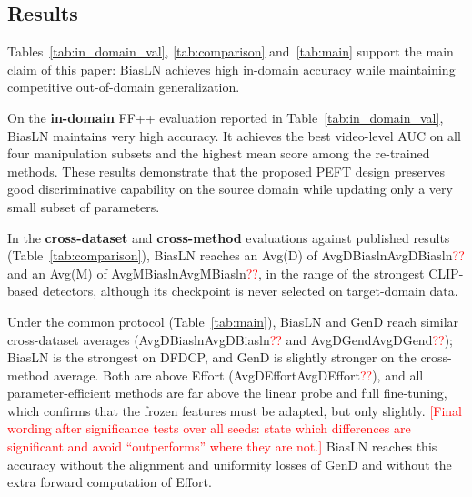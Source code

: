 \documentclass[fonts]{icst}
\newif\ifrevmark\revmarkfalse
\newcommand{\rev}[1]{\ifrevmark{\color{revblue}#1}\else#1\fi}
\newenvironment{revblock}{\ifrevmark\color{revblue}\fi}{}
\newif\ifpending\pendingtrue
\newcommand{\pending}[1]{\ifpending\textcolor{red}{[#1]}\else\errmessage{pending text left: #1}\fi}
\newcommand{\num}[1]{\ifcsname #1\endcsname\csname #1\endcsname\else\textcolor{red}{??}\fi}
\begin{document}
\subsection{Results}
\label{sec:main}

Tables~\ref{tab:in_domain_val}, \ref{tab:comparison} \rev{and~\ref{tab:main}} support the main claim of this paper: BiasLN achieves high in-domain accuracy while maintaining competitive out-of-domain generalization.

On the \textbf{in-domain} FF++ evaluation reported in Table~\ref{tab:in_domain_val}, BiasLN maintains very high accuracy. It achieves the best video-level AUC on all four manipulation subsets and the highest mean score \rev{among the re-trained methods}. These results \rev{demonstrate} that the proposed PEFT design preserves good discriminative capability on the source domain while updating only a very small subset of parameters.

\begin{revblock}
In the \textbf{cross-dataset} and \textbf{cross-method} evaluations against published results (Table~\ref{tab:comparison}), BiasLN reaches an Avg(D) of \num{AvgDBiasln} and an Avg(M) of \num{AvgMBiasln}, in the range of the strongest CLIP-based detectors, although its checkpoint is never selected on target-domain data.

Under the common protocol (Table~\ref{tab:main}), BiasLN and GenD reach similar cross-dataset averages (\num{AvgDBiasln} and \num{AvgDGend}); BiasLN is the strongest on DFDCP, and GenD is slightly stronger on the cross-method average. Both are above Effort (\num{AvgDEffort}), and all parameter-efficient methods are far above the linear probe and full fine-tuning, which confirms that the frozen features must be adapted, but only slightly. \pending{Final wording after significance tests over all seeds: state which differences are significant and avoid ``outperforms'' where they are not.} BiasLN reaches this accuracy without the alignment and uniformity losses of GenD and without the extra forward computation of Effort.
\end{revblock}

\begin{table}[!t]
  \centering
  \captionsetup{labelsep=period, labelfont=bf, hypcap=false}
  \caption{Ablation study of PEFT variants and the effect of $L_2$ normalization before the linear classifier.
\rev{Video AUC; Avg(D) and Avg(M) are mean $\pm$ standard deviation over $n$ seeds, per-dataset values are seed means. Bold: best; shaded: second best.}}
  \label{tab:ablation}
  \small
  \resizebox{0.85\textwidth}{!}{}
\end{table}
\end{document}
